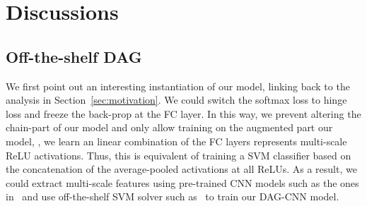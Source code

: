 \documentclass[10pt,twocolumn,letterpaper]{article}
\begin{document}
\section{Discussions\label{sec:ana}}

\subsection{Off-the-shelf DAG}

We first point out an interesting instantiation of our model, linking back to the analysis in Section~\ref{sec:motivation}. We could switch the softmax loss to hinge loss and freeze the back-prop at the FC layer. In this way, we prevent altering the chain-part of our model and only allow training on the augmented part our model, \ie, we learn an linear combination of the FC layers represents multi-scale ReLU activations. Thus, this is equivalent of training a SVM classifier based on the concatenation of the average-pooled activations at all ReLUs. As a result, we could extract multi-scale features using pre-trained CNN models such as the ones in~\cite{AlexNet, veryDeep} and use off-the-shelf SVM solver such as~\cite{liblinear} to train our DAG-CNN model.

%
%
%
%
\end{document}
